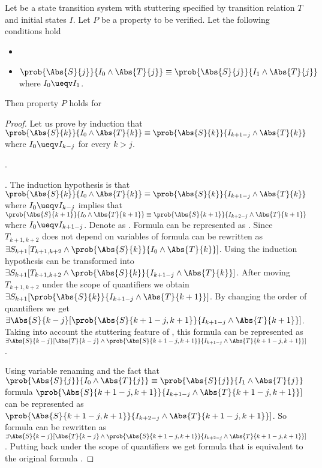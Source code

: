 \begin{proposition}
\label{prop:main_lort}
Let \Et be a state transition system with stuttering specified by
transition relation $T$ and initial states $I$. Let $P$ be a property
to be verified.  Let the following conditions hold
\begin{itemize}
\item {} 
\item  $\prob{\Abs{S}{j}}{I_0 \wedge \Abs{T}{j}} \equiv \prob{\Abs{S}{j}}{I_1 \wedge \Abs{T}{j}}$ where $I_0 \ueqv I_1$.
\end{itemize}
Then property $P$ holds for  \et
\end{proposition}
\begin{proof}[\kern-10pt Proof] Let us prove by induction that 
$\prob{\Abs{S}{k}}{I_0 \wedge \Abs{T}{k}} \equiv \prob{\Abs{S}{k}}{I_{k+1-j} \wedge \Abs{T}{k}}$ where $I_0 \ueqv I_{k-j}$ for every $k > j$.

\vspace{5pt}
\noindent{}. 

\vspace{5pt}
\noindent{}. The induction hypothesis is that
$\prob{\Abs{S}{k}}{I_0 \wedge \Abs{T}{k}} \equiv \prob{\Abs{S}{k}}{I_{k+1-j} \wedge \Abs{T}{k}}$
where $I_0 \ueqv I_{k-j}$ implies that
$\prob{\Abs{S}{k+1}}{I_0 \wedge \Abs{T}{k+1}} \equiv \prob{\Abs{S}{k+1}}{I_{k+2-j} \wedge \Abs{T}{k+1}}$
where $I_0 \ueqv
I_{k+1-j}$. Denote 
as \Fi. Formula \Fii can be represented
as . Since $T_{k+1,k+2}$ does not depend on variables
of  formula \Fii can be rewritten as
$\exists{S_{k+1}}[T_{k+1,k+2} \wedge \prob{\Abs{S}{k}}{I_0 \wedge \Abs{T}{k}}]$.
Using the induction hypothesis \Fii can be transformed into
$\exists{S_{k+1}}[T_{k+1,k+2} \wedge \prob{\Abs{S}{k}}{I_{k+1-j} \wedge \Abs{T}{k}}]$.
After moving $T_{k+1,k+2}$ under the scope of quantifiers we obtain
$\exists{S_{k+1}}[\prob{\Abs{S}{k}}{I_{k+1-j} \wedge \Abs{T}{k+1}}]$. By
changing the order of quantifiers we get
$\exists{\Abs{S}{k-j}}[\prob{\Abs{S}{k+1-j,k+1}}{I_{k+1-j} \wedge \Abs{T}{k+1}}]$.
Taking into account the stuttering feature of \Et, this formula can be
represented as $\exists{\Abs{S}{k-j}}[\Abs{T}{k-j} \wedge
\prob{\Abs{S}{k+1-j,k+1}}{I_{k+1-j} \wedge \Abs{T}{k+1-j,k+1}}]$.

Using variable renaming and the fact that  
$\prob{\Abs{S}{j}}{I_0 \wedge \Abs{T}{j}} \equiv \prob{\Abs{S}{j}}{I_1 \wedge \Abs{T}{j}}$
formula $\prob{\Abs{S}{k+1-j,k+1}}{I_{k+1-j} \wedge \Abs{T}{k+1-j,k+1}}]$
can be represented as $\prob{\Abs{S}{k+1-j,k+1}}{I_{k+2-j} \wedge \Abs{T}{k+1-j,k+1}}]$.
So formula \Fii can be rewritten as $\exists{\Abs{S}{k-j}}[\Abs{T}{k-j} \wedge
\prob{\Abs{S}{k+1-j,k+1}}{I_{k+2-j} \wedge \Abs{T}{k+1-j,k+1}}]$. Putting
 back under the scope of quantifiers we get formula
 that is equivalent
to the original formula \Fi.
\end{proof}
